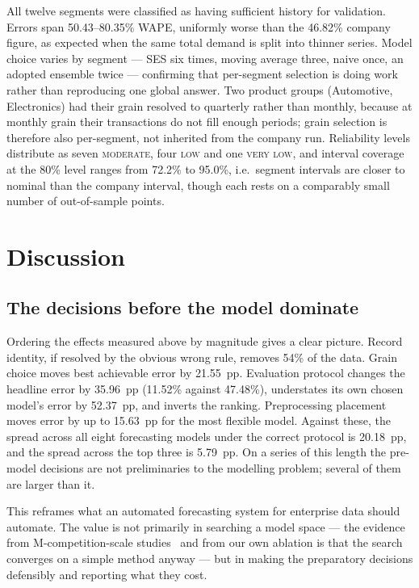 \documentclass[conference]{IEEEtran}
\begin{document}
All twelve segments were classified as having sufficient history for
validation. Errors span 50.43--80.35\% WAPE, uniformly worse than the 46.82\%
company figure, as expected when the same total demand is split into thinner
series. Model choice varies by segment --- SES six times, moving average three,
naive once, an adopted ensemble twice --- confirming that per-segment selection
is doing work rather than reproducing one global answer. Two product groups
(Automotive, Electronics) had their grain resolved to quarterly rather than
monthly, because at monthly grain their transactions do not fill enough
periods; grain selection is therefore also per-segment, not inherited from the
company run. Reliability levels distribute as seven \textsc{moderate}, four
\textsc{low} and one \textsc{very low}, and interval coverage at the 80\% level
ranges from 72.2\% to 95.0\%, i.e.\ segment intervals are closer to nominal
than the company interval, though each rests on a comparably small number of
out-of-sample points.

\section{Discussion}
\label{sec:discussion}

\subsection{The decisions before the model dominate}

Ordering the effects measured above by magnitude gives a clear picture. Record
identity, if resolved by the obvious wrong rule, removes 54\% of the data.
Grain choice moves best achievable error by 21.55~pp. Evaluation protocol
changes the headline error by 35.96~pp (11.52\% against 47.48\%), understates
its own chosen model's error by 52.37~pp, and inverts the ranking. Preprocessing placement moves error by up to 15.63~pp for the most
flexible model. Against these, the spread across all eight forecasting models
under the correct protocol is 20.18~pp, and the spread across the top three is
5.79~pp. On a series of this length the pre-model decisions are not
preliminaries to the modelling problem; several of them are larger than it.

This reframes what an automated forecasting system for enterprise data should
automate. The value is not primarily in searching a model space --- the
evidence from M-competition-scale
studies~\cite{makridakis2018statml,makridakis2022m5acc,spiliotis2022sku} and
from our own ablation is that the search converges on a simple method anyway
--- but in making the preparatory decisions defensibly and reporting what they
cost.
\end{document}
